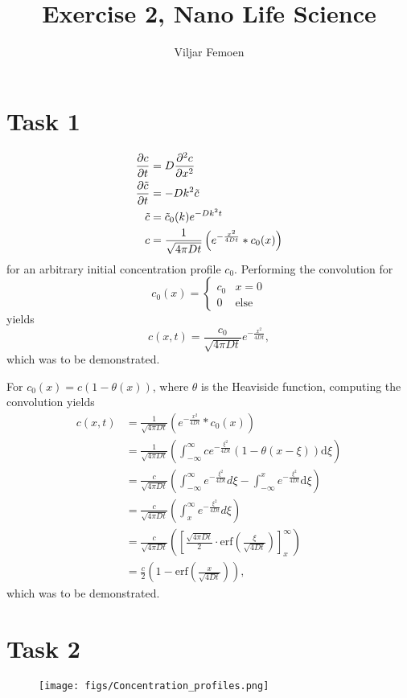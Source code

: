 

\title{Exercise 2, Nano Life Science}
\author{Viljar Femoen}



\maketitle
\section*{Task 1}

\begin{align*}
    \pde{c}{t} &= D\pde[2]{c}{x} \\
    \pde{\tilde{c}}{t} &= -Dk^2\tilde{c} \\
    \tilde{c} &= \tilde{c}_0(k)e^{-Dk^2t} \\
    c &= \frac{1}{\sqrt{4\pi Dt}}\left(e^{-\frac{x^2}{4Dt}} * c_0(x)\right)
\end{align*}
for an arbitrary initial concentration profile $c_0$. Performing the convolution for 
\begin{equation*}
    c_0(x) = \begin{cases}
        c_0 & x = 0 \\ 
        0 & \text{else}
    \end{cases}
\end{equation*}
yields
\begin{equation*}
    c(x, t) = \frac{c_0}{\sqrt{4\pi Dt}}e^{-\frac{x^2}{4Dt}},
\end{equation*}
which was to be demonstrated.

For $c_0(x) = c\left(1-\theta(x)\right)$, where $\theta$ is the Heaviside function, computing the convolution yields
\begin{align*}
    c(x, t) &= \frac{1}{\sqrt{4\pi Dt}}\left(e^{-\frac{x^2}{4Dt}} * c_0(x)\right) \\
    &= \frac{1}{\sqrt{4\pi Dt}}\left(\int_{-\infty}^\infty ce^{-\frac{\xi^2}{4Dt}}\left(1-\theta(x-\xi)\right)\text{d}\xi\right) \\
    &= \frac{c}{\sqrt{4\pi Dt}}\left(\int_{-\infty}^\infty e^{-\frac{\xi^2}{4Dt}}d\xi - \int_{-\infty}^x e^{-\frac{\xi^2}{4Dt}}\text{d}\xi\right) \\
    &= \frac{c}{\sqrt{4\pi Dt}}\left(\int_{x}^\infty e^{-\frac{\xi^2}{4Dt}}d\xi\right) \\
    &= \frac{c}{\sqrt{4\pi Dt}}\left(\left[\frac{\sqrt{4\pi Dt}}{2}\cdot\text{erf}(\frac{\xi}{\sqrt{4Dt}})\right]_x^\infty\right) \\
    &= \frac{c}{2}\left(1 - \text{erf}\left(\frac{x}{\sqrt{4Dt}}\right)\right),
\end{align*}
which was to be demonstrated.

\section*{Task 2}
\begin{figure}[h]
    \centering
    \texttt{[image: figs/Concentration\_profiles.png]}
\end{figure}

